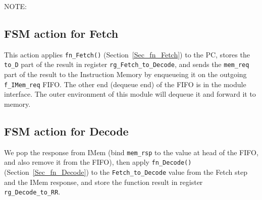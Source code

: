 
NOTE:


\subsection{FSM action for Fetch}



This action applies \verb|fn_Fetch()| (Section~\ref{Sec_fn_Fetch}) to
the PC, stores the \verb|to_D| part of the result in register
\verb|rg_Fetch_to_Decode|, and sends the \verb|mem_req| part of the
result to the Instruction Memory by enqueueing it on the outgoing
\verb|f_IMem_req| FIFO.  The other end (dequeue end) of the FIFO is in
the module interface.  The outer environment of this module will
dequeue it and forward it to memory.


\subsection{FSM action for Decode}



We pop the response from IMem (bind \verb|mem_rsp| to the value at
head of the FIFO, and also remove it from the FIFO), then apply
\verb|fn_Decode()| (Section~\ref{Sec_fn_Decode}) to the
\verb|Fetch_to_Decode| value from the Fetch step and the IMem
response, and store the function result in register
\verb|rg_Decode_to_RR|.


